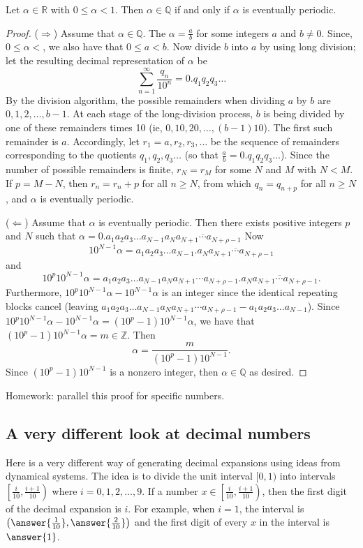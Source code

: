 \documentclass{ximera}
\begin{document}
\begin{theorem}
 Let $\alpha\in\mathbb{R}$ with $0\leq\alpha<1$. Then $\alpha\in\mathbb{Q}$ if and only if $\alpha$ is eventually periodic.
\end{theorem}
\begin{proof}
 ($\Rightarrow$)  Assume that $\alpha\in\mathbb{Q}$. The  $\alpha=\frac{a}{b}$ for some integers $a$ and $b\neq0$. Since, $0\leq\alpha<$, we also have that $0\leq a<b$. Now divide $b$ into $a$ by using long division; let the resulting decimal representation of $\alpha$ be  \[\displaystyle\sum_{n=1}^\infty \frac{q_n}{10^n}=0.q_1q_2q_3\dots\]
 By the division algorithm, the possible remainders when dividing $a$ by $b$ are $0,1,2,\dots,b-1$. At each stage of the long-division process, $b$ is being divided by one of these remainders times 10 (ie, $0,10,20,\dots,(b-1)10$). The first such remainder is $a$. Accordingly, let $r_1=a,r_2,r_3,\dots$ be the sequence of remainders corresponding to the quotients $q_1,q_2,q_3\dots$ (so that $\frac{a}{b}=0.q_1q_2q_3\dots$). Since the number of possible remainders is finite, $r_N=r_M$ for some $N$ and $M$ with $N<M$. If $p=M-N$, then $r_n=r_n+p$ for all $n\geq N$, from which $q_n=q_{n+p}$ for all $n\geq N$, and $\alpha$ is eventually periodic.
 
 ($\Leftarrow$) Assume that $\alpha$ is eventually periodic. Then there exists positive integers $p$ and $N$ such that 
$\alpha=0.a_1a_2a_3\dots a_{N-1}\overline{a_Na_{N+1}\cdots a_{N+\rho-1}}$ Now \[10^{N-1}\alpha=a_1a_2a_3\dots a_{N-1}.\overline{a_Na_{N+1}\cdots a_{N+\rho-1}}\] and \[10^p10^{N-1}\alpha=a_1a_2a_3\dots a_{N-1}a_Na_{N+1}\cdots a_{N+\rho-1}.\overline{a_Na_{N+1}\cdots a_{N+\rho-1}}.\] Furthermore, $10^p10^{N-1}\alpha-10^{N-1}\alpha$ is an integer since the identical repeating blocks cancel (leaving $a_1a_2a_3\dots a_{N-1}a_Na_{N+1}\cdots a_{N+\rho-1}-a_1a_2a_3\dots a_{N-1}$). Since $10^p10^{N-1}\alpha-10^{N-1}\alpha=(10^p-1)10^{N-1}\alpha$, we have that $(10^p-1)10^{N-1}\alpha=m\in\mathbb{Z}$. Then \[\alpha=\frac{m}{(10^p-1)10^{N-1}}.\] Since $(10^p-1)10^{N-1}$ is a nonzero integer, then $\alpha\in\mathbb{Q}$ as desired.
\end{proof}

Homework: parallel this proof for specific numbers.

\subsection{A very different look at decimal numbers}
Here is a very different way of generating decimal expansions using ideas from dynamical systems. The idea is to divide the unit interval $[0,1)$ into intervals $\left[\frac{i}{10},\frac{i+1}{10}\right)$ where $i=0,1,2,\dots,9$. If a number $x\in\left[\frac{i}{10},\frac{i+1}{10}\right)$, then the first digit of the decimal expansion is $i$. For example, when $i=1$, the interval is $\left(\answer{\frac{1}{10}},\answer{\frac{2}{10}}\right)$ and the first digit of every $x$ in the interval is $\answer{1}$.
\end{document}
